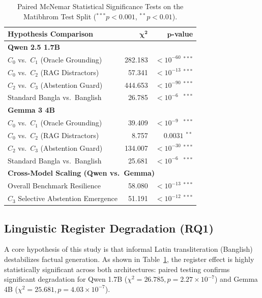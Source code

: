\documentclass[11pt,a4paper,twocolumn]{article}
\begin{document}
\begin{table}[t]
\centering
\footnotesize
\setlength{\tabcolsep}{3.5pt}
\begin{tabular}{lrr}
\toprule
\textbf{Hypothesis Comparison} & $\mathbf{\chi^2}$ & $\mathbf{p}$\textbf{-value} \\
\midrule
\multicolumn{3}{l}{\textbf{Qwen 2.5 1.7B}} \\
\quad $C_0$ vs.\ $C_1$ (Oracle Grounding) & 282.183 & $< 10^{-60}$ $^{***}$ \\
\quad $C_0$ vs.\ $C_2$ (RAG Distractors)  &  57.341 & $< 10^{-13}$ $^{***}$ \\
\quad $C_2$ vs.\ $C_3$ (Abstention Guard) & 444.653 & $< 10^{-90}$ $^{***}$ \\
\quad Standard Bangla vs.\ Banglish       &  26.785 & $< 10^{-6\phantom{0}}$ $^{***}$ \\
\midrule
\multicolumn{3}{l}{\textbf{Gemma 3 4B}} \\
\quad $C_0$ vs.\ $C_1$ (Oracle Grounding) &  39.409 & $< 10^{-9\phantom{0}}$ $^{***}$ \\
\quad $C_0$ vs.\ $C_2$ (RAG Distractors)  &   8.757 & $0.0031$ $^{**}$ \\
\quad $C_2$ vs.\ $C_3$ (Abstention Guard) & 134.007 & $< 10^{-30}$ $^{***}$ \\
\quad Standard Bangla vs.\ Banglish       &  25.681 & $< 10^{-6\phantom{0}}$ $^{***}$ \\
\midrule
\multicolumn{3}{l}{\textbf{Cross-Model Scaling (Qwen vs.\ Gemma)}} \\
\quad Overall Benchmark Resilience        &  58.080 & $< 10^{-13}$ $^{***}$ \\
\quad $C_3$ Selective Abstention Emergence & 51.191 & $< 10^{-12}$ $^{***}$ \\
\bottomrule
\end{tabular}
\caption{Paired McNemar Statistical Significance Tests on the Matibhrom Test Split ($^{***}p < 0.001$, $^{**}p < 0.01$).}
\label{tab:mcnemar_tests}
\end{table}

\subsection{Linguistic Register Degradation (RQ1)}
A core hypothesis of this study is that informal Latin transliteration (Banglish) destabilizes factual generation. As shown in Table~\ref{tab:mcnemar_tests}, the register effect is highly statistically significant across both architectures: paired testing confirms significant degradation for Qwen 1.7B ($\chi^2 = 26.785, p = 2.27 \times 10^{-7}$) and Gemma 4B ($\chi^2 = 25.681, p = 4.03 \times 10^{-7}$). 
\end{document}
